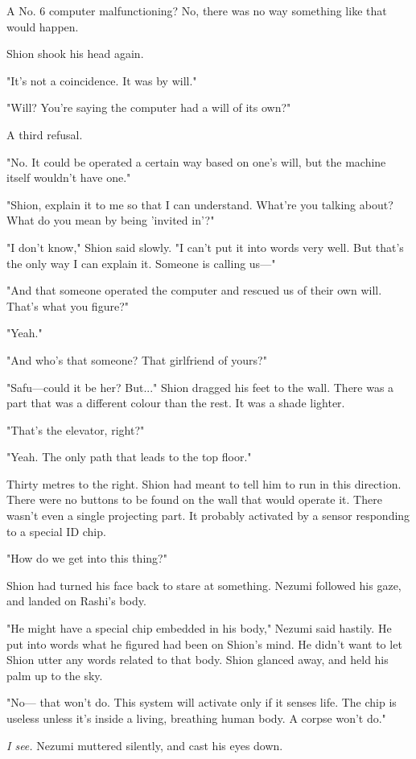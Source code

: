 A No. 6 computer malfunctioning? No, there was no way something like
that would happen.~

Shion shook his head again.

"It's not a coincidence. It was by will."

"Will? You're saying the computer had a will of its own?"

A third refusal.

"No. It could be operated a certain way based on one's will, but the
machine itself wouldn't have one."

"Shion, explain it to me so that I can understand. What're you talking
about? What do you mean by being 'invited in'?"

"I don't know," Shion said slowly. "I can't put it into words very well.
But that's the only way I can explain it. Someone is calling us---"

"And that someone operated the computer and rescued us of their own
will. That's what you figure?"

"Yeah."

"And who's that someone? That girlfriend of yours?"

"Safu---could it be her? But..." Shion dragged his feet to the wall. There
was a part that was a different colour than the rest. It was a shade
lighter.

"That's the elevator, right?"

"Yeah. The only path that leads to the top floor."

Thirty metres to the right. Shion had meant to tell him to run in this
direction. There were no buttons to be found on the wall that would
operate it. There wasn't even a single projecting part. It probably
activated by a sensor responding to a special ID chip.

"How do we get into this thing?"

Shion had turned his face back to stare at something. Nezumi followed
his gaze, and landed on Rashi's body.

"He might have a special chip embedded in his body," Nezumi said
hastily. He put into words what he figured had been on Shion's mind. He
didn't want to let Shion utter any words related to that body. Shion
glanced away, and held his palm up to the sky.

"No--- that won't do. This system will activate only if it senses life.
The chip is useless unless it's inside a living, breathing human body. A
corpse won't do."

\emph{I see.} Nezumi muttered silently, and cast his eyes down.

